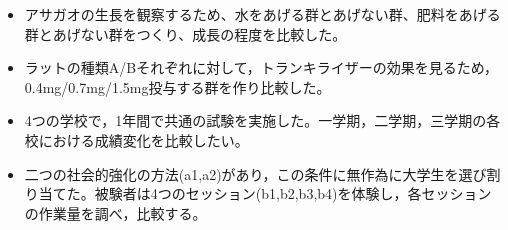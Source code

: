 \begin{itemize}
	\item アサガオの生長を観察するため、水をあげる群とあげない群、肥料をあげる群とあげない群をつくり、成長の程度を比較した。
	\item ラットの種類A/Bそれぞれに対して，トランキライザーの効果を見るため，0.4mg/0.7mg/1.5mg投与する群を作り比較した。
	\item 4つの学校で，1年間で共通の試験を実施した。一学期，二学期，三学期の各校における成績変化を比較したい。
	\item 二つの社会的強化の方法(a1,a2)があり，この条件に無作為に大学生を選び割り当てた。被験者は4つのセッション(b1,b2,b3,b4)を体験し，各セッションの作業量を調べ，比較する。
\end{itemize}

